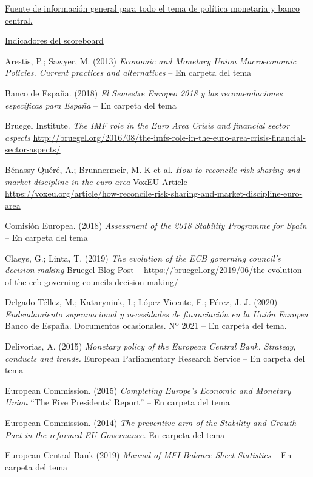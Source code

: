 \documentclass{nuevotema}
\begin{document}
\href{https://www.ecb.europa.eu/mopo/eaec/html/index.en.html}{Fuente de información general para todo el tema de política monetaria y banco central.}

\href{http://ec.europa.eu/eurostat/web/macroeconomic-imbalances-procedure/indicators/main-tables}{Indicadores del scoreboard}

Arestis, P.; Sawyer, M. (2013) \textit{Economic and Monetary Union Macroeconomic Policies. Current practices and alternatives}  -- En carpeta del tema

Banco de España. (2018) \textit{El Semestre Europeo 2018 y las recomendaciones específicas para España}  -- En carpeta del tema

Bruegel Institute. \textit{The IMF role in the Euro Area Crisis and financial sector aspects} \url{http://bruegel.org/2016/08/the-imfs-role-in-the-euro-area-crisis-financial-sector-aspects/}

Bénassy-Quéré, A.; Brunnermeir, M. K et al. \textit{How to reconcile risk sharing and market discipline in the euro area} VoxEU Article -- \url{https://voxeu.org/article/how-reconcile-risk-sharing-and-market-discipline-euro-area}

Comisión Europea. (2018) \textit{Assessment of the 2018 Stability Programme for Spain}  -- En carpeta del tema

Claeys, G.; Linta, T. (2019) \textit{The evolution of the ECB governing council's decision-making} Bruegel Blog Post -- \url{https://bruegel.org/2019/06/the-evolution-of-the-ecb-governing-councils-decision-making/}

Delgado-Téllez, M.; Kataryniuk, I.; López-Vicente, F.; Pérez, J. J. (2020) \textit{Endeudamiento supranacional y necesidades de financiación en la Unión Europea} Banco de España. Documentos ocasionales. Nº 2021 -- En carpeta del tema.

Delivorias, A. (2015) \textit{Monetary policy of the European Central Bank. Strategy, conducts and trends.}  European Parliamentary Research Service -- En carpeta del tema

European Commission. (2015) \textit{Completing Europe's Economic and Monetary Union}  ``The Five Presidents' Report'' -- En carpeta del tema

European Commission. (2014) \textit{The preventive arm of the Stability and Growth Pact in the reformed EU Governance.}  En carpeta del tema

European Central Bank (2019) \textit{Manual of MFI Balance Sheet Statistics}  -- En carpeta del tema
\end{document}
